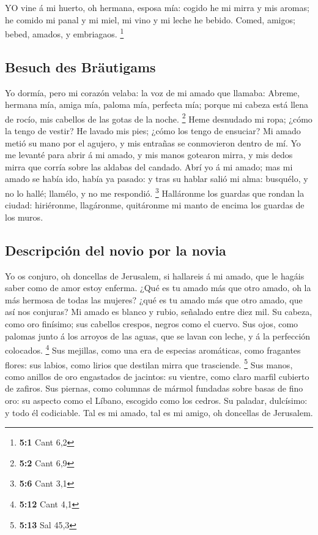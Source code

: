  YO vine á mi huerto, oh hermana, esposa mía: cogido he mi
mirra y mis aromas; he comido mi panal y mi miel, mi vino y mi leche he
bebido. Comed, amigos; bebed, amados, y embriagaos. \footnote{\textbf{5:1}
  Cant 6,2}

\hypertarget{besuch-des-bruxe4utigams}{%
\subsection{Besuch des Bräutigams}\label{besuch-des-bruxe4utigams}}

 Yo dormía, pero mi corazón velaba: la voz de mi amado que
llamaba: Abreme, hermana mía, amiga mía, paloma mía, perfecta mía;
porque mi cabeza está llena de rocío, mis cabellos de las gotas de la
noche. \footnote{\textbf{5:2} Cant 6,9}  Heme desnudado mi
ropa; ¿cómo la tengo de vestir? He lavado mis pies; ¿cómo los tengo de
ensuciar?  Mi amado metió su mano por el agujero, y mis
entrañas se conmovieron dentro de mí.  Yo me levanté para
abrir á mi amado, y mis manos gotearon mirra, y mis dedos mirra que
corría sobre las aldabas del candado.  Abrí yo á mi amado;
mas mi amado se había ido, había ya pasado: y tras su hablar salió mi
alma: busquélo, y no lo hallé; llamélo, y no me respondió. \footnote{\textbf{5:6}
  Cant 3,1}  Halláronme los guardas que rondan la ciudad:
hiriéronme, llagáronme, quitáronme mi manto de encima los guardas de los
muros.

\hypertarget{descripciuxf3n-del-novio-por-la-novia}{%
\subsection{Descripción del novio por la
novia}\label{descripciuxf3n-del-novio-por-la-novia}}

 Yo os conjuro, oh doncellas de Jerusalem, si hallareis á mi
amado, que le hagáis saber como de amor estoy enferma.  ¿Qué
es tu amado más que otro amado, oh la más hermosa de todas las mujeres?
¿qué es tu amado más que otro amado, que así nos conjuras? 
Mi amado es blanco y rubio, señalado entre diez mil.  Su
cabeza, como oro finísimo; sus cabellos crespos, negros como el cuervo.
 Sus ojos, como palomas junto á los arroyos de las aguas,
que se lavan con leche, y á la perfección colocados. \footnote{\textbf{5:12}
  Cant 4,1}  Sus mejillas, como una era de especias
aromáticas, como fragantes flores: sus labios, como lirios que destilan
mirra que trasciende. \footnote{\textbf{5:13} Sal 45,3} 
Sus manos, como anillos de oro engastados de jacintos: su vientre, como
claro marfil cubierto de zafiros.  Sus piernas, como
columnas de mármol fundadas sobre basas de fino oro: su aspecto como el
Líbano, escogido como los cedros.  Su paladar, dulcísimo: y
todo él codiciable. Tal es mi amado, tal es mi amigo, oh doncellas de
Jerusalem.

